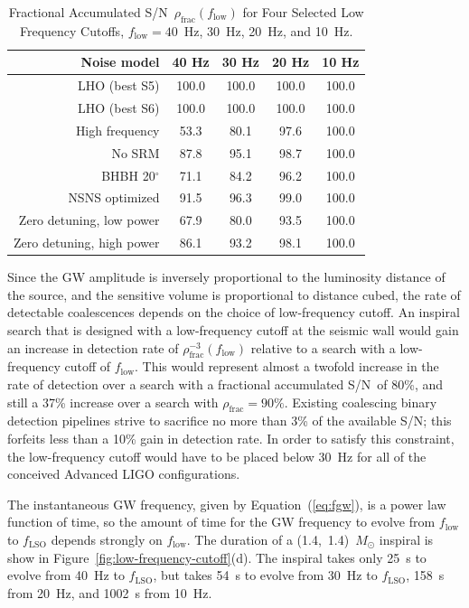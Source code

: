 \documentclass[preprint2]{aastex}
\newcommand{\SNR}{S/N}%
\newcommand{\Msun}{\ensuremath{M_{\odot}}}
\begin{document}
\begin{table}[h]
\begin{center}
\caption{\label{table:accum_snr}Fractional Accumulated \SNR\ $\rho_\mathrm{frac}(f_\mathrm{low})$ for Four Selected Low Frequency Cutoffs, $f_\mathrm{low}=40$~Hz, 30~Hz, 20~Hz, and 10~Hz.}
\begin{tabular}{rcccc}
\hline\hline
Noise model & 40 Hz & 30 Hz & 20 Hz & 10 Hz \\
\hline
LHO (best S5) & 100.0 & 100.0 & 100.0 & 100.0 \\
LHO (best S6) & 100.0 & 100.0 & 100.0 & 100.0 \\
High frequency & 53.3 & 80.1 & 97.6 & 100.0 \\
No SRM & 87.8 & 95.1 & 98.7 & 100.0 \\
BHBH 20$^\circ$ & 71.1 & 84.2 & 96.2 & 100.0 \\
NSNS optimized & 91.5 & 96.3 & 99.0 & 100.0 \\
Zero detuning, low power & 67.9 & 80.0 & 93.5 & 100.0 \\
Zero detuning, high power & 86.1 & 93.2 & 98.1 & 100.0 \\
\hline
\end{tabular}
\end{center}
\end{table}

Since the GW amplitude is inversely proportional to the luminosity distance of the source, and the sensitive volume is proportional to distance cubed, the rate of detectable coalescences depends on the choice of low-frequency cutoff.  An inspiral search that is designed with a low-frequency cutoff at the seismic wall would gain an increase in detection rate of $\rho_\mathrm{frac}^{-3}(f_\mathrm{low})$ relative to a search with a low-frequency cutoff of $f_\mathrm{low}$.  This would represent almost a twofold increase in the rate of detection over a search with a fractional accumulated \SNR\ of 80\%, and still a 37\% increase over a search with $\rho_\mathrm{frac} = 90\%$.  Existing coalescing binary detection pipelines strive to sacrifice no more than 3\% of the available \SNR; this forfeits less than a 10\% gain in detection rate.  In order to satisfy this constraint, the low-frequency cutoff would have to be placed below 30~Hz for all of the conceived Advanced LIGO configurations.

The instantaneous GW frequency, given by Equation~(\ref{eq:fgw}), is a power law function of time, so the amount of time for the GW frequency to evolve from $f_\mathrm{low}$ to $f_\mathrm{LSO}$ depends strongly on $f_\mathrm{low}$.  The duration of a (1.4,~1.4)~$\Msun$ inspiral is show in Figure~\ref{fig:low-frequency-cutoff}(d).  The inspiral takes only 25~s to evolve from 40~Hz to $f_\mathrm{LSO}$, but takes 54~s to evolve from 30~Hz to $f_\mathrm{LSO}$, 158~s from 20~Hz, and 1002~s from 10~Hz.
\end{document}
